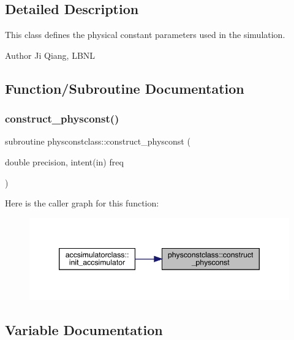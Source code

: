 \subsection{Detailed Description}
This class defines the physical constant parameters used in the simulation. 

\begin{DoxyAuthor}{Author}
Ji Qiang, L\+B\+NL 
\end{DoxyAuthor}


\subsection{Function/\+Subroutine Documentation}
\mbox{\label{namespacephysconstclass_ad68ae2acfa376befa6478a8b40a80168}} 
\subsubsection{\texorpdfstring{construct\_physconst()}{construct\_physconst()}}
{\footnotesize\ttfamily subroutine physconstclass\+::construct\+\_\+physconst (\begin{DoxyParamCaption}\item[{double precision, intent(in)}]{freq }\end{DoxyParamCaption})}

Here is the caller graph for this function\+:\nopagebreak
\begin{figure}[H]
\begin{center}
\leavevmode
\includegraphics[width=346pt]{namespacephysconstclass_ad68ae2acfa376befa6478a8b40a80168_icgraph}
\end{center}
\end{figure}


\subsection{Variable Documentation}
\mbox{\label{namespacephysconstclass_a8622c3bd03bb3706b061386b694c8f71}} 
